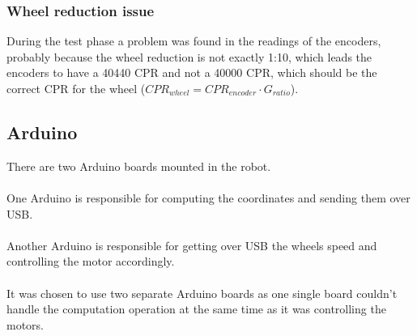 \subsubsection{Wheel reduction issue}
During the test phase a problem was found in the readings of the encoders, probably because the wheel reduction is not exactly 1:10, 
which leads the encoders to have a 40440 CPR and not a 40000 CPR, which 
should be the correct CPR for the wheel ($CPR_{wheel} = CPR_{encoder} \cdot G_{ratio}$).

\subsection{Arduino}
There are two Arduino boards mounted in the robot. 
\\ \\
One Arduino is responsible for computing the coordinates and sending them over USB.
\\ \\
Another Arduino is responsible for getting over USB the wheels speed and controlling the motor accordingly.
\\ \\
It was chosen to use two separate Arduino boards as one single board couldn't handle the computation operation at the same time as it was controlling the motors.


